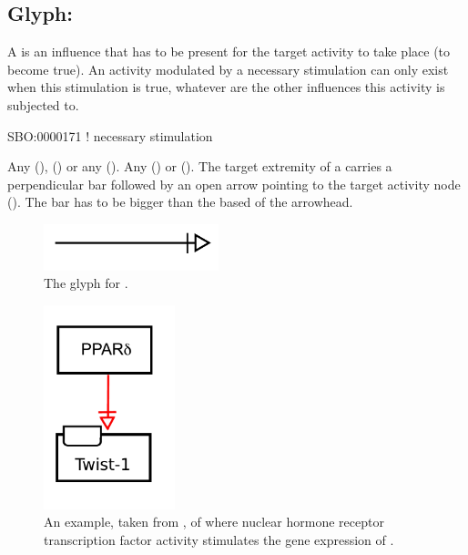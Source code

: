 \subsection{Glyph: }
\label{sec:af:trigger}
A  is an influence that has to be present for the target activity to take place (to become true).  An activity modulated by a necessary stimulation can only exist when this stimulation is true, whatever are the other influences this activity is subjected to.

\begin{glyphDescription}

\glyphSboTerm SBO:0000171 ! necessary stimulation

  \glyphOrigin Any  (),   () or any  ().
 \glyphTarget Any  () or  ().
 \glyphEndPoint The target extremity of a  carries a perpendicular bar followed by an open arrow pointing to the target activity node ().  The bar has to be bigger than the based of the arrowhead.

\end{glyphDescription}

\begin{figure}[H]
  \centering
  \includegraphics[width = 2in]{images/necessaryStimulation}
  \caption{The \AF glyph for .}
  \label{fig:af:trigger}
\end{figure}

\begin{figure}[H]
  \centering
  \includegraphics[width = 1.5in]{examples/ex-necessaryStimulation}
  \caption{An example, taken from , of  where nuclear hormone receptor  transcription factor activity stimulates the gene expression of . }
  \label{fig:af:ex-NS}
\end{figure}
